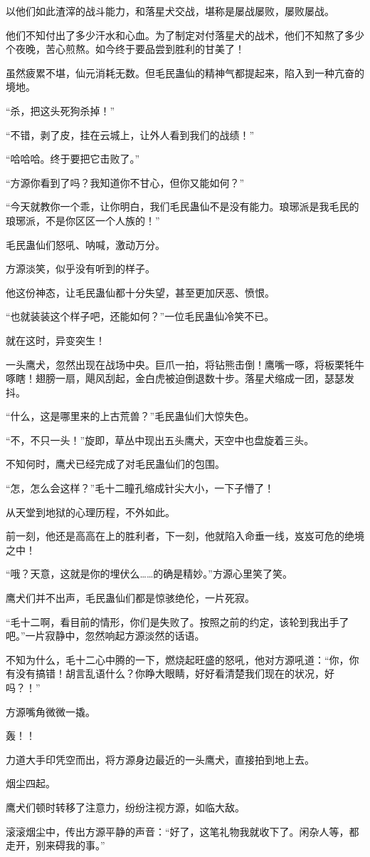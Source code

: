 \begin{this_body}
以他们如此渣滓的战斗能力，和落星犬交战，堪称是屡战屡败，屡败屡战。

他们不知付出了多少汗水和心血。为了制定对付落星犬的战术，他们不知熬了多少个夜晚，苦心煎熬。如今终于要品尝到胜利的甘美了！

虽然疲累不堪，仙元消耗无数。但毛民蛊仙的精神气都提起来，陷入到一种亢奋的境地。

“杀，把这头死狗杀掉！”

“不错，剥了皮，挂在云城上，让外人看到我们的战绩！”

“哈哈哈。终于要把它击败了。”

“方源你看到了吗？我知道你不甘心，但你又能如何？”

“今天就教你一个乖，让你明白，我们毛民蛊仙不是没有能力。琅琊派是我毛民的琅琊派，不是你区区一个人族的！”

毛民蛊仙们怒吼、呐喊，激动万分。

方源淡笑，似乎没有听到的样子。

他这份神态，让毛民蛊仙都十分失望，甚至更加厌恶、愤恨。

“也就装装这个样子吧，还能如何？”一位毛民蛊仙冷笑不已。

就在这时，异变突生！

一头鹰犬，忽然出现在战场中央。巨爪一拍，将钻熊击倒！鹰嘴一啄，将板栗牦牛啄瞎！翅膀一扇，飓风刮起，金白虎被迫倒退数十步。落星犬缩成一团，瑟瑟发抖。

“什么，这是哪里来的上古荒兽？”毛民蛊仙们大惊失色。

“不，不只一头！”旋即，草丛中现出五头鹰犬，天空中也盘旋着三头。

不知何时，鹰犬已经完成了对毛民蛊仙们的包围。

“怎，怎么会这样？”毛十二瞳孔缩成针尖大小，一下子懵了！

从天堂到地狱的心理历程，不外如此。

前一刻，他还是高高在上的胜利者，下一刻，他就陷入命垂一线，岌岌可危的绝境之中！

“哦？天意，这就是你的埋伏么……的确是精妙。”方源心里笑了笑。

鹰犬们并不出声，毛民蛊仙们都是惊骇绝伦，一片死寂。

“毛十二啊，看目前的情形，你们是失败了。按照之前的约定，该轮到我出手了吧。”一片寂静中，忽然响起方源淡然的话语。

不知为什么，毛十二心中腾的一下，燃烧起旺盛的怒吼，他对方源吼道：“你，你有没有搞错！胡言乱语什么？你睁大眼睛，好好看清楚我们现在的状况，好吗？！”

方源嘴角微微一撬。

轰！！

力道大手印凭空而出，将方源身边最近的一头鹰犬，直接拍到地上去。

烟尘四起。

鹰犬们顿时转移了注意力，纷纷注视方源，如临大敌。

滚滚烟尘中，传出方源平静的声音：“好了，这笔礼物我就收下了。闲杂人等，都走开，别来碍我的事。”

\end{this_body}

